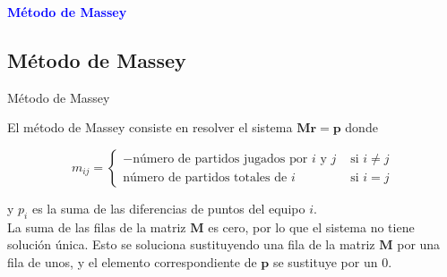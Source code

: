 \documentclass[10pt,hyperref={unicode}]{beamer}
\begin{document}
	\begin{frame}
		\begin{center}
			\Huge\textbf{\textsf{\textcolor{blue}{Método de Massey}}}
		\end{center}
	\end{frame}
	
	
	\subsection{Método de Massey}
	
	\begin{frame}{Método de Massey}
		
		El método de Massey consiste en resolver el sistema $\mathbf{M r} = \mathbf{p}$
		donde 
		
		\[ m_{ij} = \begin{cases}
		- \text{número de partidos jugados por } i \text{ y } j & \text{ si } i \neq j \\
	      \text{número de partidos totales de } i & \text{ si } i = j 
		
		\end{cases}\]
		
		y $p_i$ es la suma de las diferencias de puntos del equipo $i$.\\
		
		La suma de las filas de la matriz $\mathbf{M}$ es cero, por lo que el sistema no tiene solución única. Esto se soluciona sustituyendo una fila de la matriz $\mathbf{M}$ por una fila de unos, y el elemento correspondiente de $\mathbf{p}$ se sustituye por un $0$.
	
	\end{frame}
	
\end{document}
